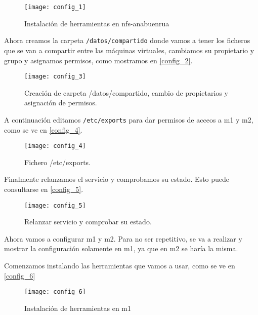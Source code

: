\begin{figure}[h!]
\begin{center}
\caption{Instalación de herramientas en nfs-anabuenrua}
\label{config_1}
\texttt{[image: config\_1]}
\end{center}
\end{figure}

Ahora creamos la carpeta \verb|/datos/compartido| donde vamos a tener los ficheros que se van a compartir entre las máquinas virtuales, cambiamos su propietario y grupo y asignamos permisos, como mostramos en \eqref{config_2}.

\begin{figure}[h!]
\begin{center}
\caption{Creación de carpeta /datos/compartido, cambio de propietarios y asignación de permisos.}
\label{config_2}
\texttt{[image: config\_3]}
\end{center}
\end{figure}

A continuación editamos \verb|/etc/exports| para dar permisos de acceos a m1 y m2, como se ve en \eqref{config_4}.

\begin{figure}[h!]
\begin{center}
\caption{Fichero /etc/exports.}
\label{config_4}
\texttt{[image: config\_4]}
\end{center}
\end{figure}

Finalmente relanzamos el servicio y comprobamos su estado. Esto puede consultarse en \eqref{config_5}.

\begin{figure}[h!]
\begin{center}
\caption{Relanzar servicio y comprobar su estado.}
\label{config_5}
\texttt{[image: config\_5]}
\end{center}
\end{figure}

Ahora vamos a configurar m1 y m2. Para no ser repetitivo, se va a realizar y mostrar la configuración solamente en m1, ya que en m2 se haría la misma.

Comenzamos instalando las herramientas que vamos a usar, como se ve en \eqref{config_6}

\begin{figure}[h!]
\begin{center}
\caption{Instalación de herramientas en m1}
\label{config_6}
\texttt{[image: config\_6]}
\end{center}
\end{figure}

